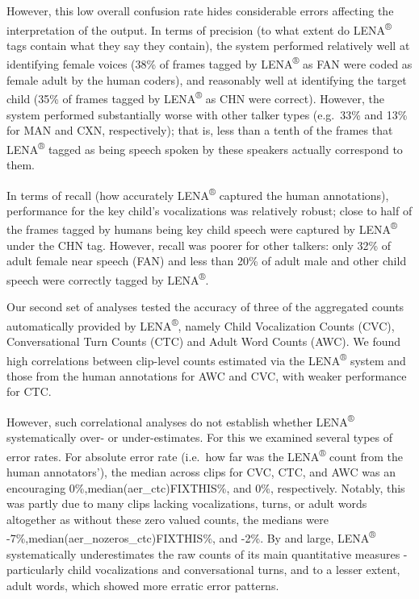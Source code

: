 \documentclass[english,table,man,floatsintext]{apa6}
\begin{document}
However, this low overall confusion rate hides considerable errors affecting the interpretation of the output. In terms of precision (to what extent do LENA\textsuperscript{®} tags contain what they say they contain), the system performed relatively well at identifying female voices (38\% of frames tagged by LENA\textsuperscript{®} as FAN were coded as female adult by the human coders), and reasonably well at identifying the target child (35\% of frames tagged by LENA\textsuperscript{®} as CHN were correct). However, the system performed substantially worse with other talker types (e.g.~33\% and 13\% for MAN and CXN, respectively); that is, less than a tenth of the frames that LENA\textsuperscript{®} tagged as being speech spoken by these speakers actually correspond to them.

In terms of recall (how accurately LENA\textsuperscript{®} captured the human annotations), performance for the key child's vocalizations was relatively robust; close to half of the frames tagged by humans being key child speech were captured by LENA\textsuperscript{®} under the CHN tag. However, recall was poorer for other talkers: only 32\% of adult female near speech (FAN) and less than 20\% of adult male and other child speech were correctly tagged by LENA\textsuperscript{®}.

Our second set of analyses tested the accuracy of three of the aggregated counts automatically provided by LENA\textsuperscript{®}, namely Child Vocalization Counts (CVC), Conversational Turn Counts (CTC) and Adult Word Counts (AWC). We found high correlations between clip-level counts estimated via the LENA\textsuperscript{®} system and those from the human annotations for AWC and CVC, with weaker performance for CTC.

However, such correlational analyses do not establish whether LENA\textsuperscript{®} systematically over- or under-estimates. For this we examined several types of error rates. For absolute error rate (i.e.~how far was the LENA\textsuperscript{®} count from the human annotators'), the median across clips for CVC, CTC, and AWC was an encouraging 0\%,median(aer\_ctc)FIXTHIS\%, and 0\%, respectively. Notably, this was partly due to many clips lacking vocalizations, turns, or adult words altogether as without these zero valued counts, the medians were -7\%,median(aer\_nozeros\_ctc)FIXTHIS\%, and -2\%. By and large, LENA\textsuperscript{®} systematically underestimates the raw counts of its main quantitative measures - particularly child vocalizations and conversational turns, and to a lesser extent, adult words, which showed more erratic error patterns.
\end{document}
